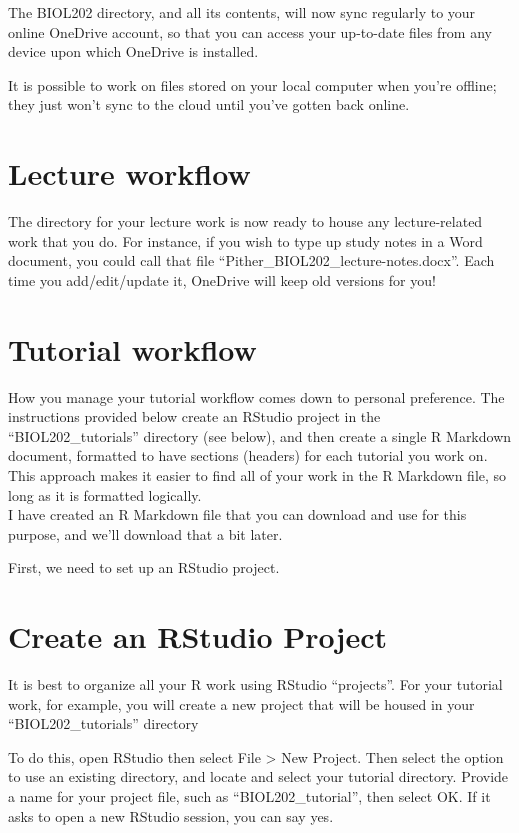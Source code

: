 \documentclass[
]{book}
\begin{document}
The BIOL202 directory, and all its contents, will now sync regularly to your online OneDrive account, so that you can access your up-to-date files from any device upon which OneDrive is installed.

It is possible to work on files stored on your local computer when you're offline; they just won't sync to the cloud until you've gotten back online.

\section{Lecture workflow}\label{lecture_workflow}

The directory for your lecture work is now ready to house any lecture-related work that you do. For instance, if you wish to type up study notes in a Word document, you could call that file ``Pither\_BIOL202\_lecture-notes.docx''. Each time you add/edit/update it, OneDrive will keep old versions for you!

\section{Tutorial workflow}\label{tutorial_workflow}

How you manage your tutorial workflow comes down to personal preference. The instructions provided below create an RStudio project in the ``BIOL202\_tutorials'' directory (see below), and then create a single R Markdown document, formatted to have sections (headers) for each tutorial you work on. This approach makes it easier to find all of your work in the R Markdown file, so long as it is formatted logically.\\
I have created an R Markdown file that you can download and use for this purpose, and we'll download that a bit later.

First, we need to set up an RStudio project.

\section{Create an RStudio Project}\label{create_project}

It is best to organize all your R work using RStudio ``projects''. For your tutorial work, for example, you will create a new project that will be housed in your ``BIOL202\_tutorials'' directory

To do this, open RStudio then select File \textgreater{} New Project. Then select the option to use an existing directory, and locate and select your tutorial directory. Provide a name for your project file, such as ``BIOL202\_tutorial'', then select OK. If it asks to open a new RStudio session, you can say yes.
\end{document}
